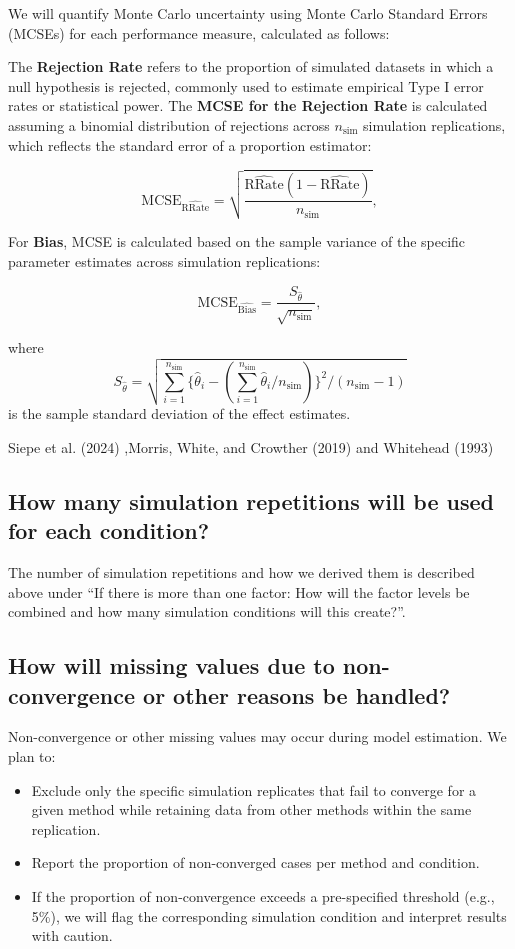 \documentclass[
  man,
  floatsintext]{apa7}
\providecommand{\tightlist}{%
  \setlength{\itemsep}{0pt}\setlength{\parskip}{0pt}}
\begin{document}
We will quantify Monte Carlo uncertainty using Monte Carlo Standard
Errors (MCSEs) for each performance measure, calculated as follows:

The \textbf{Rejection Rate} refers to the proportion of simulated
datasets in which a null hypothesis is rejected, commonly used to
estimate empirical Type I error rates or statistical power. The
\textbf{MCSE for the Rejection Rate} is calculated assuming a binomial
distribution of rejections across \(n_{\text{sim}}\) simulation
replications, which reflects the standard error of a proportion
estimator:

\[
\text{MCSE}_{\widehat{\text{RRate}}} = \sqrt{\frac{\widehat{\text{RRate}} (1 - \widehat{\text{RRate}})}{n_{\text{sim}}}},
\]

For \textbf{Bias}, MCSE is calculated based on the sample variance of
the specific parameter estimates across simulation replications:

\[
\text{MCSE}_{\widehat{\text{Bias}}} = \frac{S_{\hat{\theta}}}{\sqrt{n_{\text{sim}}}},
\]

where \[
S_{\hat{\theta}} = \sqrt{\sum_{i=1}^{n_{\text{sim}}}{ \{\hat{\theta}_i - (\sum_{i=1}^{n_{\text{sim}}}\hat{\theta}_i/n_{\text{sim}})\}^2}/(n_{\text{sim}} - 1)}
\] is the sample standard deviation of the effect estimates.

Siepe et al. (2024) ,Morris, White, and Crowther (2019) and Whitehead
(1993)

\subsection{How many simulation repetitions will be used for each
condition?}\label{how-many-simulation-repetitions-will-be-used-for-each-condition}

The number of simulation repetitions and how we derived them is
described above under ``If there is more than one factor: How will the
factor levels be combined and how many simulation conditions will this
create?''.

\subsection{How will missing values due to non-convergence or other
reasons be
handled?}\label{how-will-missing-values-due-to-non-convergence-or-other-reasons-be-handled}

Non-convergence or other missing values may occur during model
estimation. We plan to:

\begin{itemize}
\tightlist
\item
  Exclude only the specific simulation replicates that fail to converge
  for a given method while retaining data from other methods within the
  same replication.
\item
  Report the proportion of non-converged cases per method and condition.
\item
  If the proportion of non-convergence exceeds a pre-specified threshold
  (e.g., 5\%), we will flag the corresponding simulation condition and
  interpret results with caution.
\end{itemize}
\end{document}
